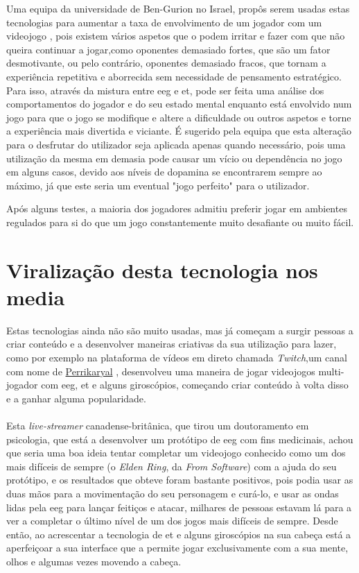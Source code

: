 \documentclass{report}
\begin{document}
Uma equipa da universidade de Ben-Gurion no Israel, propôs serem usadas estas tecnologias para aumentar a taxa de envolvimento de um jogador com um videojogo \cite{DDA}, pois existem vários aspetos que o podem irritar e fazer com que não queira continuar a jogar,como oponentes demasiado fortes, que são um fator desmotivante, ou pelo contrário, oponentes demasiado fracos, que tornam a experiência repetitiva e aborrecida sem necessidade de pensamento estratégico. Para isso, através da mistura entre \ac{eeg} e \ac{et}, pode ser feita uma análise dos comportamentos do jogador e do seu estado mental enquanto está envolvido num jogo para que o jogo se modifique e altere a dificuldade ou outros aspetos e torne a experiência mais divertida e viciante. É sugerido pela equipa que esta alteração para o desfrutar do utilizador seja aplicada apenas quando necessário, pois uma utilização da mesma em demasia pode causar um vício ou dependência no jogo em alguns casos, devido aos níveis de dopamina se encontrarem sempre ao máximo, já que este seria um eventual "jogo perfeito" para o utilizador.

Após alguns testes, a maioria dos jogadores admitiu preferir jogar em ambientes regulados para si do que um jogo constantemente muito desafiante ou muito fácil.

\section{Viralização desta tecnologia nos media}
Estas tecnologias ainda não são muito usadas, mas já começam a surgir pessoas a criar conteúdo e a desenvolver maneiras criativas da sua utilização para lazer, como por exemplo na plataforma de vídeos em direto chamada \textit{Twitch},um canal com nome de \href{https://www.twitch.tv/perrikaryal}{Perrikaryal} , desenvolveu uma maneira de jogar videojogos multi-jogador com \ac{eeg}, \ac{et} e alguns giroscópios, começando criar conteúdo à volta disso e a ganhar alguma popularidade.
\paragraph{}
Esta \textit{live-streamer} canadense-britânica, que tirou um doutoramento em psicologia, que está a desenvolver um protótipo de \ac{eeg} com fins medicinais, achou que seria uma boa ideia tentar completar um videojogo conhecido como um dos mais difíceis de sempre (o \textit{Elden Ring}, da \textit{From Software}) com a ajuda do seu protótipo\cite{EldenRing}, e os resultados que obteve foram bastante positivos, pois podia usar as duas mãos para a movimentação do seu personagem e curá-lo, e usar as ondas lidas pela \ac{eeg} para lançar feitiços e atacar, milhares de pessoas estavam lá para a ver a completar o último nível de um dos jogos mais difíceis de sempre. 
Desde então,  ao acrescentar a tecnologia de \ac{et} e alguns giroscópios na sua cabeça está a aperfeiçoar a sua interface que a permite jogar exclusivamente com a sua mente, olhos e algumas vezes movendo a cabeça.
\end{document}
